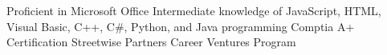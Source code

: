 \begin{cvskills}
  \cvskill {} {Proficient in Microsoft Office}
	\cvskill {} {Intermediate knowledge of JavaScript, HTML, Visual Basic, C++, C\#, Python, and Java programming }
	\cvskill {} {Comptia A+ Certification}
	\cvskill {} {Streetwise Partners Career Ventures Program}
  \end{cvskills}
